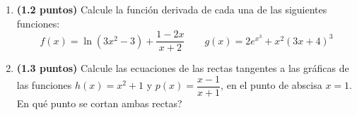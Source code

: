 
\begin{enumerate}[label=\alph*)]
  \item \textbf{(1.2 puntos)} Calcule la función derivada de cada una de
  las siguientes funciones:
  \[
  f(x)=\ln(3x^2-3)+\frac{1-2x}{x+2}\qquad
  g(x)=2e^{x^3}+x^2(3x+4)^3
  \]
  \item \textbf{(1.3 puntos)} Calcule las ecuaciones de las rectas tangentes
  a las gráficas de las funciones $h(x)=x^2+1$ y $p(x)=\dfrac{x-1}{x+1}$,
  en el punto de abscisa $x=1$. \textquestiondown{}En qué punto se cortan
  ambas rectas?
\end{enumerate}
